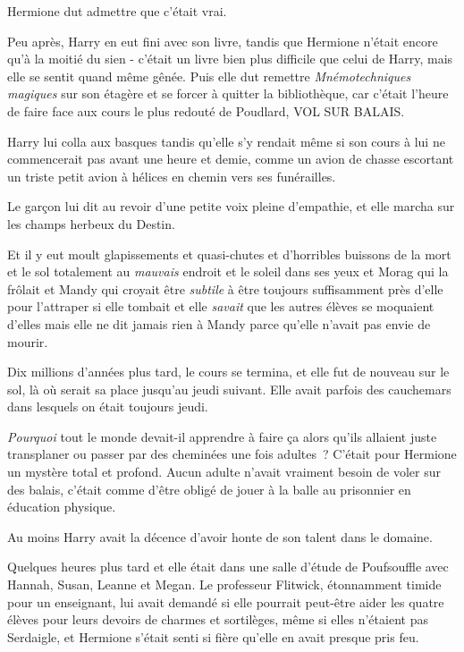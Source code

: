Hermione dut admettre que c'était vrai.

Peu après, Harry en eut fini avec son livre, tandis que Hermione n'était encore qu'à la moitié du sien - c'était un livre bien plus difficile que celui de Harry, mais elle se sentit quand même gênée. Puis elle dut remettre \emph{Mnémotechniques magiques} sur son étagère et se forcer à quitter la bibliothèque, car c'était l'heure de faire face aux cours le plus redouté de Poudlard, VOL SUR BALAIS.

Harry lui colla aux basques tandis qu'elle s'y rendait même si son cours à lui ne commencerait pas avant une heure et demie, comme un avion de chasse escortant un triste petit avion à hélices en chemin vers ses funérailles.

Le garçon lui dit au revoir d'une petite voix pleine d'empathie, et elle marcha sur les champs herbeux du Destin.

Et il y eut moult glapissements et quasi-chutes et d'horribles buissons de la mort et le sol totalement au \emph{mauvais} endroit et le soleil dans ses yeux et Morag qui la frôlait et Mandy qui croyait être \emph{subtile} à être toujours suffisamment près d'elle pour l'attraper si elle tombait et elle \emph{savait} que les autres élèves se moquaient d'elles mais elle ne dit jamais rien à Mandy parce qu'elle n'avait pas envie de mourir.

Dix millions d'années plus tard, le cours se termina, et elle fut de nouveau sur le sol, là où serait sa place jusqu'au jeudi suivant. Elle avait parfois des cauchemars dans lesquels on était toujours jeudi.

\emph{Pourquoi} tout le monde devait-il apprendre à faire ça alors qu'ils allaient juste transplaner ou passer par des cheminées une fois adultes~? C'était pour Hermione un mystère total et profond. Aucun adulte n'avait vraiment besoin de voler sur des balais, c'était comme d'être obligé de jouer à la balle au prisonnier en éducation physique.

Au moins Harry avait la décence d'avoir honte de son talent dans le domaine.

\later

Quelques heures plus tard et elle était dans une salle d'étude de Poufsouffle avec Hannah, Susan, Leanne et Megan. Le professeur Flitwick, étonnamment timide pour un enseignant, lui avait demandé si elle pourrait peut-être aider les quatre élèves pour leurs devoirs de charmes et sortilèges, même si elles n'étaient pas Serdaigle, et Hermione s'était senti si fière qu'elle en avait presque pris feu.


